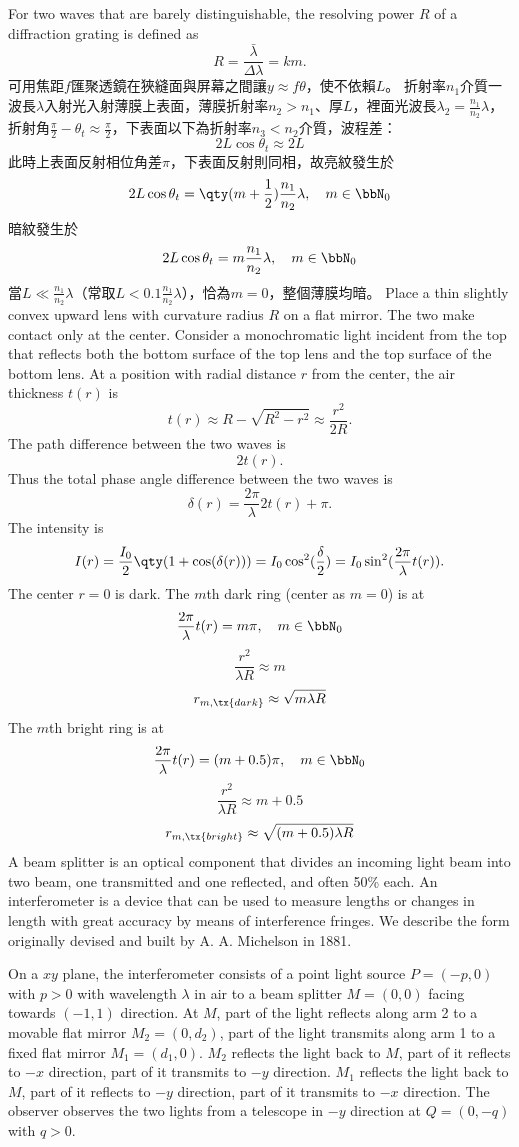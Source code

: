 \documentclass[a4paper,12pt]{report}
\begin{document}
For two waves that are barely distinguishable, the resolving power $R$ of a diffraction grating is defined as
\[R=\frac{\bar{\lambda}}{\Delta\lambda}=km.\]
可用焦距$f$匯聚透鏡在狹縫面與屏幕之間讓$y\approx f\theta$，使不依賴$L$。
折射率$n_1$介質一波長$\lambda$入射光入射薄膜上表面，薄膜折射率$n_2>n_1$、厚$L$，裡面光波長$\lambda_2=\frac{n_1}{n_2}\lambda$，折射角$\frac{\pi}{2}-\theta_t\approx\frac{\pi}{2}$，下表面以下為折射率$n_3<n_2$介質，波程差：
\[2L\cos\theta_t\approx 2L\]
此時上表面反射相位角差$\pi$，下表面反射則同相，故亮紋發生於
\[2L\cos\theta_t=\qty(m+\frac{1}{2})\frac{n_1}{n_2}\lambda,\quad m\in\bbN_0\]
暗紋發生於
\[2L\cos\theta_t=m\frac{n_1}{n_2}\lambda,\quad m\in\bbN_0\]
當$L\ll\frac{n_1}{n_2}\lambda$（常取$L<0.1\frac{n_1}{n_2}\lambda$），恰為$m=0$，整個薄膜均暗。
Place a thin slightly convex upward lens with curvature radius $R$ on a flat mirror. The two make contact only at the center. Consider a monochromatic light incident from the top that reflects both the bottom surface of the top lens and the top surface of the bottom lens. At a position with radial distance $r$ from the center, the air thickness $t(r)$ is
\[t(r)\approx R-\sqrt{R^2-r^2}\approx\frac{r^2}{2R}.\]
The path difference between the two waves is
\[2t(r).\]
Thus the total phase angle difference between the two waves is
\[\delta(r)=\frac{2\pi}{\lambda}2t(r)+\pi.\]
The intensity is
\[I(r)=\frac{I_0}{2}\qty(1+\cos(\delta(r)))=I_0\cos^2(\frac{\delta}{2})=I_0\sin^2(\frac{2\pi}{\lambda}t(r)).\]
The center $r=0$ is dark. The $m$th dark ring (center as $m=0$) is at
\[\frac{2\pi}{\lambda}t(r)=m\pi,\quad m\in\bbN_0\]
\[\frac{r^2}{\lambda R}\approx m\]
\[r_{m,\tx{dark}}\approx\sqrt{m\lambda R}\]
The $m$th bright ring is at
\[\frac{2\pi}{\lambda}t(r)=(m+0.5)\pi,\quad m\in\bbN_0\]
\[\frac{r^2}{\lambda R}\approx m+0.5\]
\[r_{m,\tx{bright}}\approx\sqrt{(m+0.5)\lambda R}\]
A beam splitter is an optical component that divides an incoming light beam into two beam, one transmitted and one reflected, and often 50\% each.
An interferometer is a device that can be used to measure lengths or changes in length with great accuracy by means of interference fringes. We describe the form originally devised and built by A. A. Michelson in 1881.

On a $xy$ plane, the interferometer consists of a point light source $P=(-p,0)$ with $p>0$ with wavelength $\lambda$ in air to a beam splitter $M=(0,0)$ facing towards $(-1,1)$ direction. At $M$, part of the light reflects along arm 2 to a movable flat mirror $M_2=(0,d_2)$, part of the light transmits along arm 1 to a fixed flat mirror $M_1=(d_1,0)$. $M_2$ reflects the light back to $M$, part of it reflects to $-x$ direction, part of it transmits to $-y$ direction. $M_1$ reflects the light back to $M$, part of it reflects to $-y$ direction, part of it transmits to $-x$ direction. The observer observes the two lights from a telescope in $-y$ direction at $Q=(0,-q)$ with $q>0$.
\end{document}
